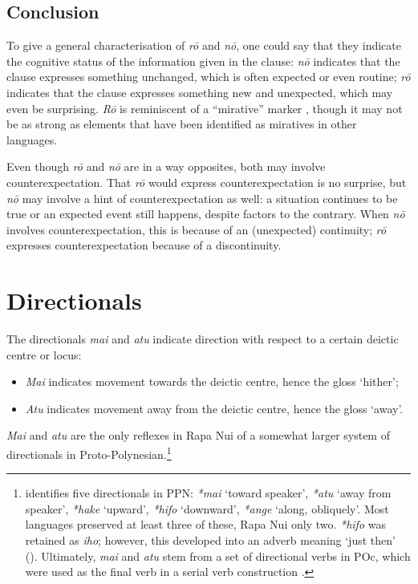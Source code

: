 \subsection{Conclusion}\label{sec:7.4.3}

To give a general characterisation of \textit{rō} and \textit{nō}, one could say that they indicate the cognitive status of the information given in the clause: \textit{nō} indicates that the clause expresses something unchanged, which is often expected or even routine; \textit{rō} indicates that the clause expresses something new and unexpected, which may even be surprising. \textit{Rō} is reminiscent of a “mirative” marker \citep[255]{Payne1997}, though it may not be as strong as elements that have been identified as miratives in other languages.

Even though \textit{rō} and \textit{nō} are in a way opposites, both may involve counterexpectation. That \textit{rō} would express counterexpectation is no surprise, but \textit{nō} may involve a hint of counterexpectation as well: a situation continues to be true or an expected event still happens, despite factors to the contrary. When \textit{nō} involves counterexpectation, this is because of an (unexpected) continuity; \textit{rō} expresses counterexpectation because of a discontinuity.

\section{Directionals}\label{sec:7.5}
The directionals \textit{mai} and \textit{atu} indicate direction with respect to a certain deictic centre or locus:

\newpage 
\begin{itemize}
\item 
\textit{Mai} indicates movement towards the deictic centre, hence the gloss ‘hither’;

\item 
\textit{Atu} indicates movement away from the deictic centre, hence the gloss ‘away’.

\end{itemize}

\textit{Mai} and \textit{atu} are the only reflexes in Rapa Nui of a somewhat larger system of directionals in Proto-Polynesian.\footnote{\label{fn:350}\citet[34]{Clark1976} identifies five directionals in PPN: \textit{*mai} ‘toward speaker’, \textit{*atu} ‘away from speaker’, \textit{*hake} ‘upward’, \textit{*hifo} ‘downward’, \textit{*ange} ‘along, obliquely’. Most languages preserved at least three of these, Rapa Nui only two. \textit{*hifo} was retained as \textit{iho}; however, this developed into an adverb meaning ‘just then’ ().
Ultimately, \textit{mai} and \textit{atu} stem from a set of directional verbs in POc, which were used as the final verb in a serial verb construction \citep[194]{Ross2004}.} 

